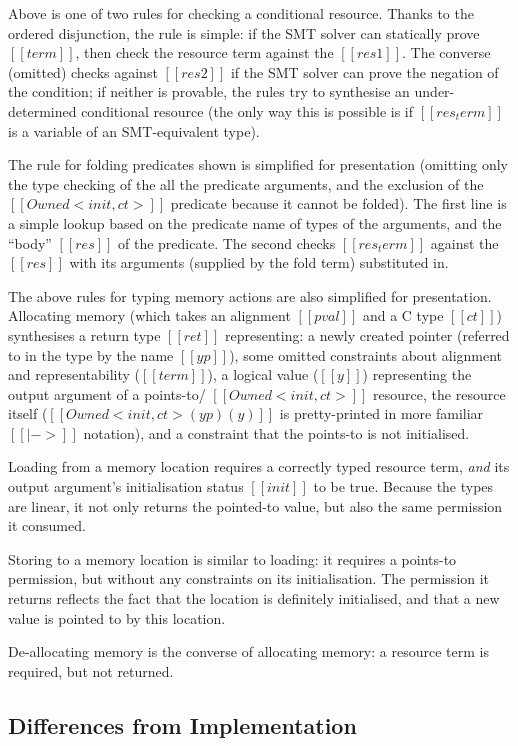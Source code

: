 \documentclass[11pt]{article}%
\begin{document}
Above is one of two rules for checking a conditional resource.
Thanks to the ordered disjunction, the rule is simple: if the SMT
solver can statically prove $[[ term ]]$, then check the
resource term against the $[[ res1 ]]$. The converse (omitted) checks against
$[[ res2 ]]$ if the SMT solver can prove the negation of the condition; if
neither is provable, the rules try to synthesise an under-determined
conditional resource (the only way this is possible is if $[[ res_term ]]$ is a
variable of an SMT-equivalent type).

The rule for folding predicates shown is simplified for presentation (omitting
only the type checking of the all the predicate arguments, and the exclusion of
the $[[ Owned < init , ct > ]]$ predicate because it cannot be folded). The first line
is a simple lookup based on the predicate name of types of the arguments, and
the ``body'' $[[ res ]]$ of the predicate. The second checks $[[ res_term ]]$
against the $[[ res ]]$ with its arguments (supplied by the fold term)
substituted in.

The above rules for typing memory actions are also simplified for
presentation.  Allocating memory (which takes an alignment $[[ pval ]]$ and a C
type $[[ ct ]]$) synthesises a return type $[[ ret ]]$ representing: a newly
created pointer (referred to in the type by the name $[[ yp ]]$), some omitted
constraints about alignment and representability ($[[ term ]]$), a logical
value ($[[ y ]]$) representing the output argument of a points-to/
$[[ Owned< init , ct > ]]$ resource, the resource itself
($[[ Owned <init , ct> ( yp ) ( y ) ]]$ is pretty-printed in more familiar $[[ |-> ]]$
notation), and a constraint that the points-to is not initialised.

Loading from a memory location requires a correctly typed resource term,
\emph{and} its output argument's initialisation status $[[ init ]]$ to be
true. Because the types are linear, it not only returns the pointed-to value,
but also the same permission it consumed.

Storing to a memory location is similar to loading: it requires a points-to permission,
but without any constraints on its initialisation. The permission it returns
reflects the fact that the location is definitely initialised, and that a new
value is pointed to by this location.

De-allocating memory is the converse of allocating memory: a resource term is
required, but not returned.

\subsection{Differences from Implementation}
\end{document}
